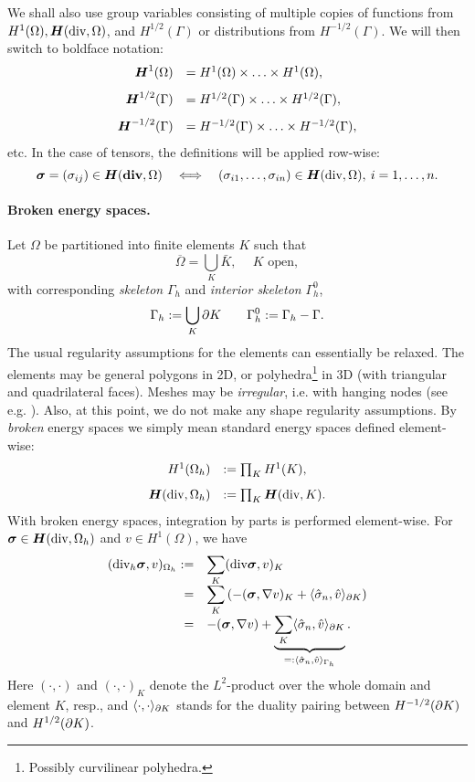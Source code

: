 We shall also use group variables consisting of multiple copies of functions from $H^1(\Omega),\bfH(\text{div},\Omega)$, and $H^{1/2}(\Gamma)$ or distributions from $H^{-1/2}(\Gamma)$. We will then switch to boldface notation:
\[
\begin{array}{rl}
\bfH^1(\Omega) & = H^1(\Omega) \times \ldots \times H^1(\Omega),\\[8pt]
\bfH^{1/2}(\Gamma) & = H^{1/2}(\Gamma) \times \ldots \times H^{1/2}(\Gamma), \\[8pt]
\bfH^{-1/2}(\Gamma) & = H^{-1/2}(\Gamma) \times \ldots \times H^{-1/2}(\Gamma),
\end{array}
\]
etc. In the case of tensors, the definitions will be applied row-wise:
$$
\bfsig = (\sigma_{ij}) \in \bfH(\text{\bf div},\Omega) \quad \Longleftrightarrow \quad
(\sigma_{i1},\ldots,\sigma_{in}) \in \bfH(\text{div},\Omega),\: i=1,\ldots,n.
$$

\paragraph*{Broken energy spaces.}

Let $\Omega$ be partitioned into finite elements $K$ such that
\[
  \overline{\Omega} = \bigcup_K  \bar{K},\: \quad K \text { open},
\]
with corresponding {\em skeleton} $\Gamma_h$ and {\em interior
  skeleton} $\Gamma_h^0$,
\[
\Gamma_h := \bigcup_K \ptl K\qquad \Gamma_h^0 := \Gamma_h - \Gamma.
\]
The usual regularity assumptions for the elements can essentially be relaxed. 
The elements may be general polygons in 2D, or polyhedra\footnote{Possibly curvilinear polyhedra.}
 in 3D (with triangular and quadrilateral
faces). Meshes may be {\em irregular}, i.e. with hanging nodes (see e.g. \cite[pp. 211]{hpbook}).
Also, at this point, we do not make any shape regularity assumptions.
By {\em broken} energy spaces we simply mean standard energy spaces defined element-wise:
\[
\begin{array}{rl}
H^1(\Omega_h) & := \prod_K H^1(K), \\[8pt]
\bfH(\text{div},\Omega_h) & := \prod_K \bfH(\text{div},K).
\end{array}
\]
With broken energy spaces, integration by parts is performed element-wise. 
For $\bfsig \in \bfH(\text{div},\Omega_h)$ and $v \in H^1(\Omega)$, we have
\[
\begin{array}{rl}
(\text{div}_h \bfsig, v)_{\Omega_h}  := &\ds \sum_K (\text{div} \bfsig, v)_K \\[8pt]
 = &\ds \sum_K \left( -(\bfsig, \bfnab v)_K 
+ {\langle\hat{\sigma}_n,\hat{v}\rangle _{\ptl K}} \right) \\[8pt]
 = &\ds - (\bfsig, \bfnab v) + {\underbrace{\sum_K 
\langle\hat{\sigma}_n,\hat{v}\rangle_{\ptl K}}
_{=: \langle\hat{\sigma}_n,\hat{v}\rangle_{\Gamma_h}}.}
\end{array}
\]
Here $(\cdot,\cdot)$ and $(\cdot,\cdot)_K$ denote the $L^2$-product over
the whole domain and element $K$, resp., and $\langle\cdot,\cdot\rangle_{\ptl K}$
stands for the duality pairing between $H^{-1/2}(\ptl K)$ and
$H^{1/2}(\ptl K)$.


